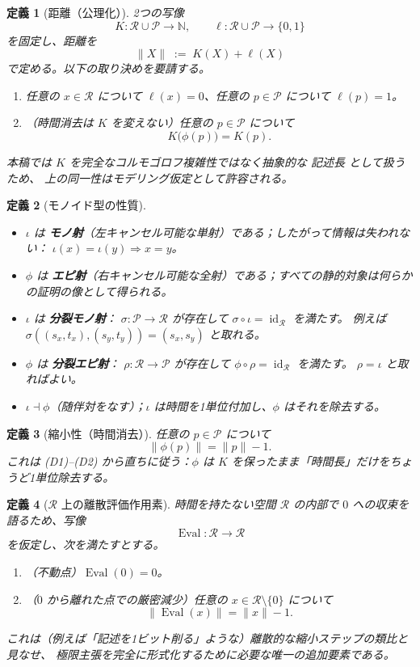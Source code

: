 \documentclass[12pt,a4paper]{article}
\newcommand{\dfix}{\mathfrak{0}}          %
\newcommand{\Rep}{\mathcal{R}}           %
\newcommand{\Prf}{\mathcal{P}}           %
\newtheorem{definition}{定義}[section]
\begin{document}
\begin{definition}[距離（公理化）]
2つの写像
\[
  K:\Rep\cup\Prf\to\mathbb{N},
  \qquad
  \ell:\Rep\cup\Prf\to\{0,1\}
\]
を固定し、距離を
\[
  \|X\|\;:=\;K(X)+\ell(X)
\]
で定める。以下の取り決めを要請する。
\begin{enumerate}[label=(D\arabic*)]
  \item 任意の $x\in\Rep$ について $\ell(x)=0$、任意の $p\in\Prf$ について $\ell(p)=1$。
  \item（時間消去は $K$ を変えない）任意の $p\in\Prf$ について
        \[
          K\bigl(\phi(p)\bigr)=K(p).
        \]
\end{enumerate}
本稿では $K$ を完全なコルモゴロフ複雑性ではなく抽象的な \emph{記述長} として扱うため、
上の同一性はモデリング仮定として許容される。
\end{definition}

\begin{definition}[モノイド型の性質]
\begin{itemize}[nosep]
  \item $\iota$ は \textbf{モノ射}（左キャンセル可能な単射）である；したがって情報は失われない：
        $\iota(x)=\iota(y)\Rightarrow x=y$。
  \item $\phi$ は \textbf{エピ射}（右キャンセル可能な全射）である；すべての静的対象は何らかの証明の像として得られる。
  \item $\iota$ は \textbf{分裂モノ射}：
        $\sigma:\Prf\to\Rep$ が存在して $\sigma\circ\iota=\operatorname{id}_{\Rep}$ を満たす。
        例えば $\sigma((s_x,t_x),(s_y,t_y))=(s_x,s_y)$ と取れる。
  \item $\phi$ は \textbf{分裂エピ射}：
        $\rho:\Rep\to\Prf$ が存在して $\phi\circ\rho=\operatorname{id}_{\Rep}$ を満たす。
        $\rho=\iota$ と取ればよい。
  \item $\iota\dashv\phi$（随伴対をなす）；$\iota$ は時間を1単位付加し、$\phi$ はそれを除去する。
\end{itemize}
\end{definition}

\begin{definition}[縮小性（時間消去）]
任意の $p\in\Prf$ について
\[
  \|\phi(p)\| = \|p\|-1.
\]
これは (D1)--(D2) から直ちに従う：$\phi$ は $K$ を保ったまま「時間長」だけをちょうど1単位除去する。
\end{definition}

\begin{definition}[$\Rep$ 上の離散評価作用素]
時間を持たない空間 $\Rep$ の内部で $\dfix$ への収束を語るため、写像
\[
  \operatorname{Eval}:\Rep\to\Rep
\]
を仮定し、次を満たすとする。
\begin{enumerate}[label=(E\arabic*)]
  \item（不動点）$\operatorname{Eval}(\dfix)=\dfix$。
  \item（$\dfix$ から離れた点での厳密減少）任意の $x\in\Rep\setminus\{\dfix\}$ について
        \[
          \|\operatorname{Eval}(x)\| = \|x\|-1.
        \]
\end{enumerate}
これは（例えば「記述を1ビット削る」ような）離散的な縮小ステップの類比と見なせ、
極限主張を完全に形式化するために必要な唯一の追加要素である。
\end{definition}
\end{document}
